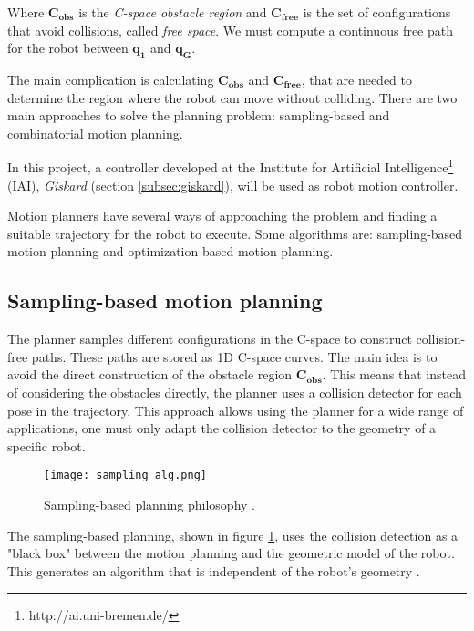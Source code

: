 Where $\bm{C_{obs}}$ is the \textit{C-space obstacle region} and $\bm{C_{free}}$ is the set of configurations that avoid collisions, called \textit{free space}. We must compute a continuous free path for the robot between $\bm{q_{1}}$ and $\bm{q_{G}}$.

The main complication is calculating $\bm{C_{obs}}$ and $\bm{C_{free}}$, that are needed to determine the region where the robot can move without colliding. There are two main approaches to solve the planning problem: sampling-based and combinatorial motion planning.

In this project, a controller developed at the Institute for Artificial Intelligence\footnote{http://ai.uni-bremen.de/} (IAI), \textit{Giskard} (section \ref{subsec:giskard}), will be used as robot motion controller.

Motion planners have several ways of approaching the problem and finding a suitable trajectory for the robot to execute. Some algorithms are: sampling-based motion planning and optimization based motion planning.

\subsection{Sampling-based motion planning}
\label{subsec:planning}

The planner samples different configurations in the C-space to construct collision-free paths. These paths are stored as 1D C-space curves. The main idea is to avoid the direct construction of the obstacle region $\bm{C_{obs}}$. This means that instead of considering the obstacles directly, the planner uses a collision detector for each pose in the trajectory. This approach allows using the planner for a wide range of applications, one must only adapt the collision detector to the geometry of a specific robot.
\begin{figure}[H]
	\centering
	\texttt{[image: sampling\_alg.png]}
	\vspace{-10pt}
	\caption[Sampling-based planning]{Sampling-based planning philosophy \citep[chap. 5, page 185]{planning}.}
	\vspace{-15pt}
	\label{fig:sampling}
\end{figure}

The sampling-based planning, shown in figure \ref{fig:sampling}, uses the collision detection as a "black box" between the motion planning and the geometric model of the robot. This generates an algorithm that is independent of the robot's geometry \citep{planning} .

